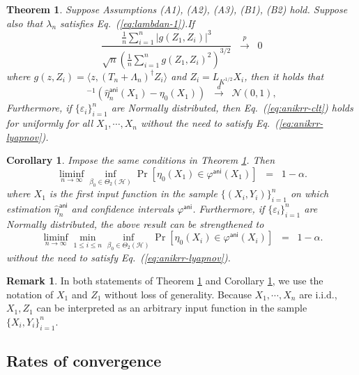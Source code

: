 \documentclass[aos]{imsart}
\renewcommand{\hat}{\widehat}
\newcommand{\mH}{\mathcal H}
\newcommand{\ani}{\mathsf{ani}}
\theoremstyle{plain}
\newtheorem{theorem}{Theorem}[section]
\newtheorem{corollary}{Corollary}[section]
\theoremstyle{definition}
\theoremstyle{definition}
\newtheorem{remark}{Remark}[section]
\begin{document}
\begin{theorem}
Suppose Assumptions (A1), (A2), (A3), (B1), (B2) hold. Suppose also that $\lambda_n$ satisfies Eq.~(\ref{eq:lambdan-1}).If 
\begin{equation}
\frac{\frac{1}{n}\sum_{i=1}^n |g(Z_1,Z_i)|^3}{\sqrt{n}(\frac{1}{n}\sum_{i=1}^n g(Z_1,Z_i)^2)^{3/2}}\;\;\overset{p}{\to}\;\; 0
\label{eq:anikrr-lyapnov}
\end{equation}
where $g(z,Z_i)=\langle z,(T_n+\Lambda_n)^{\dagger}Z_i\rangle$ and $Z_i=L_{K^{1/2}}X_i$, then it holds that
\begin{equation}
[\hat\sigma_n^\ani(Z_1)]^{-1}(\hat\eta_n^\ani(X_1)-\eta_0(X_1)) \;\;\overset{d}{\to}\;\;\mathcal N(0,1),
\label{eq:anikrr-clt}
\end{equation}
Furthermore, if $\{\varepsilon_i\}_{i=1}^n$ are Normally distributed, then Eq.~(\ref{eq:anikrr-clt}) holds for \emph{uniformly} for all $X_1,\cdots,X_n$ without the need to satisfy Eq.~(\ref{eq:anikrr-lyapnov}).
\label{thm:anikrr-limiting}
\end{theorem}

\begin{corollary}
Impose the same conditions in Theorem \ref{thm:anikrr-limiting}. Then 
$$
\liminf_{n\to\infty}\inf_{\beta_0\in\Theta_2(\mH)}\Pr[\eta_0(X_1)\in\varphi^\ani(X_1)] \;\; = \;\; 1-\alpha.
$$
where $X_1$ is the first input function in the sample $\{(X_i,Y_i)\}_{i=1}^n$ on which estimation $\hat\eta_n^{\ani}$ and confidence intervals $\varphi^\ani$.
Furthermore, if $\{\varepsilon_i\}_{i=1}^n$ are Normally distributed, the above result can be strengthened to
$$
\liminf_{n\to\infty}\min_{1\leq i\leq n}\inf_{\beta_0\in\Theta_2(\mH)}\Pr[\eta_0(X_i)\in\varphi^\ani(X_i)] \;\; = \;\; 1-\alpha.
$$
without the need to satisfy Eq.~(\ref{eq:anikrr-lyapnov}).
\label{cor:anikrr-ci}
\end{corollary}

\begin{remark}
In both statements of Theorem \ref{thm:anikrr-limiting} and Corollary \ref{cor:anikrr-ci}, we use the notation of $X_1$ and $Z_1$ without loss of generality.
Because $X_1,\cdots,X_n$ are i.i.d., $X_1,Z_1$ can be interpreted as an arbitrary input function in the sample $\{X_i,Y_i\}_{i=1}^n$.
\end{remark}

\subsection{Rates of convergence}
\end{document}
